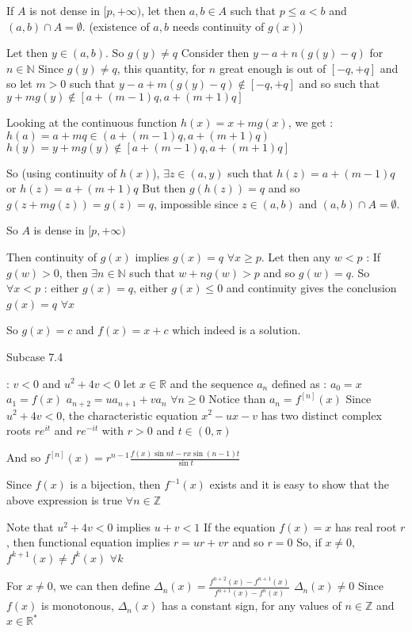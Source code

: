 \begin{solution}
If $A$ is not dense in $[p,+\infty)$, let then $a,b\in A$ such that $p\le a<b$ and $(a,b)\cap A=\emptyset$. (existence of $a,b$ needs continuity of $g(x)$)

Let then $y\in(a,b)$. So $g(y)\ne q$ 
Consider then $y-a+n(g(y)-q)$ for $n\in\mathbb N$
Since $g(y)\ne q$, this quantity, for $n$ great enough is out of $[-q,+q]$ and so let $m>0$ such that $y-a+m(g(y)-q)\notin[-q,+q]$ and so such that $y+mg(y)\notin[a+(m-1)q,a+(m+1)q]$

Looking at the continuous function $h(x)=x+mg(x)$, we get :
$h(a)=a+mq\in(a+(m-1)q,a+(m+1)q)$
$h(y)=y+mg(y)\notin[a+(m-1)q,a+(m+1)q]$

So (using continuity of $h(x)$), $\exists z\in(a,y)$ such that $h(z)=a+(m-1)q$ or $h(z)=a+(m+1)q$
But then $g(h(z))=q$ and so $g(z+mg(z))=g(z)=q$, impossible since $z\in(a,b)$ and $(a,b)\cap A=\emptyset$.

So $A$ is dense in $[p,+\infty)$

Then continuity of $g(x)$ implies $g(x)=q$ $\forall x\ge p$.
Let then any $w<p$ : If $g(w)>0$, then $\exists n\in\mathbb N$ such that $w+ng(w)>p$ and so $g(w)=q$. So $\forall x<p$ : either $g(x)=q$, either $g(x)\le 0$ and continuity gives the conclusion $g(x)=q$ $\forall x$

So $g(x)=c$ and $f(x)=x+c$ which indeed is a solution.

\begin{bolded}Subcase 7.4 \end{bolded}: $v<0$ and $u^2+4v<0$
let $x\in\mathbb R$ and the sequence $a_n$ defined as :
$a_0=x$
$a_1=f(x)$
$a_{n+2}=ua_{n+1}+va_n$ $\forall n\ge 0$
Notice than $a_n=f^{[n]}(x)$
Since $u^2+4v<0$, the characteristic equation $x^2-ux-v$ has two distinct complex roots $re^{it}$ and $re^{-it}$ with $r>0$ and $t\in(0,\pi)$

And so $f^{[n]}(x)=r^{n-1}\frac{f(x)\sin nt-rx\sin(n-1)t}{\sin t}$

Since $f(x)$ is a bijection, then $f^{-1}(x)$ exists and it is easy to show that the above expression is true $\forall n\in\mathbb Z$

Note that $u^2+4v<0$ implies $u+v<1$
If the equation $f(x)=x$ has real root $r$, then functional equation implies $r=ur+vr$ and so $r=0$
So, if $x\ne 0$, $f^{k+1}(x)\ne f^k(x)$ $\forall k$

For $x\ne 0$, we can then define $\Delta_n(x)=\frac{f^{n+2}(x)-f^{n+1}(x)}{f^{n+1}(x)-f^{n}(x)}$
$\Delta_n(x)\ne 0$
Since $f(x)$ is monotonous, $\Delta_n(x)$ has a constant sign, for any values of $n\in\mathbb Z$ and $x\in\mathbb R^*$


\end{solution}
